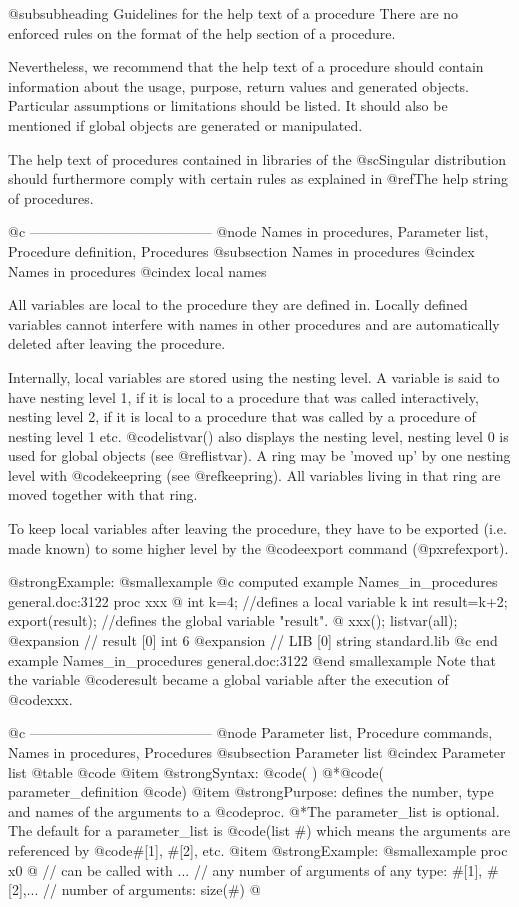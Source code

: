 {{{@subsubheading Guidelines for the help text of a procedure
There are no enforced rules on the format of the help section of a
procedure.

Nevertheless, we recommend that the help text of a procedure should
contain information about the usage,
purpose, return values and generated objects. Particular assumptions or
limitations should be listed. It should also be mentioned if global
objects are generated or manipulated.

The help text of procedures contained in libraries of the
@sc{Singular} distribution
should furthermore comply with  certain rules as explained in
@ref{The help string of procedures}.

@c ---------------------------------------
@node Names in procedures, Parameter list, Procedure definition, Procedures
@subsection Names in procedures
@cindex Names in procedures
@cindex local names

All variables are local to the procedure they are defined in.
Locally defined variables cannot interfere with names in other
procedures and are automatically deleted after leaving
the procedure.

Internally, local variables are stored using the nesting level. A variable
is said to have nesting level 1, if it is local to a procedure that was
called interactively, nesting level 2, if it is local to a procedure that
was called by a procedure of nesting level 1 etc. @code{listvar()} also
displays the nesting level, nesting level 0 is used for global objects
(see @ref{listvar}). A ring may be 'moved up' by one nesting level
with @code{keepring} (see @ref{keepring}). All variables living in that
ring are moved together with that ring.

To keep local variables after leaving the procedure, they have to be
exported (i.e. made known) to some higher level by the @code{export}
command (@pxref{export}).

@strong{Example:}
@smallexample
@c computed example Names_in_procedures general.doc:3122 
proc xxx
@{
  int k=4;        //defines a local variable k
  int result=k+2;
  export(result);  //defines the global variable "result".
@}
xxx();
listvar(all);
@expansion{} // result               [0]  int 6
@expansion{} // LIB                  [0]  string standard.lib
@c end example Names_in_procedures general.doc:3122
@end smallexample
Note that the variable @code{result} became a global variable after the
execution of @code{xxx}.

@c ---------------------------------------
@node Parameter list, Procedure commands, Names in procedures, Procedures
@subsection Parameter list
@cindex Parameter list
@table @code
@item @strong{Syntax:}
@code{( )}
@*@code{(} parameter_definition @code{)}
@item @strong{Purpose:}
defines the number, type and names of the
arguments to a @code{proc}.
@*The parameter_list is optional.
The default for a parameter_list is @code{(list #)}
which means the arguments are referenced by @code{#[1], #[2]}, etc.
@item @strong{Example:}
@smallexample
proc x0
@{
    // can be called with
... // any number of arguments of any type: #[1], #[2],...
    // number of arguments: size(#)
@}

}}}
